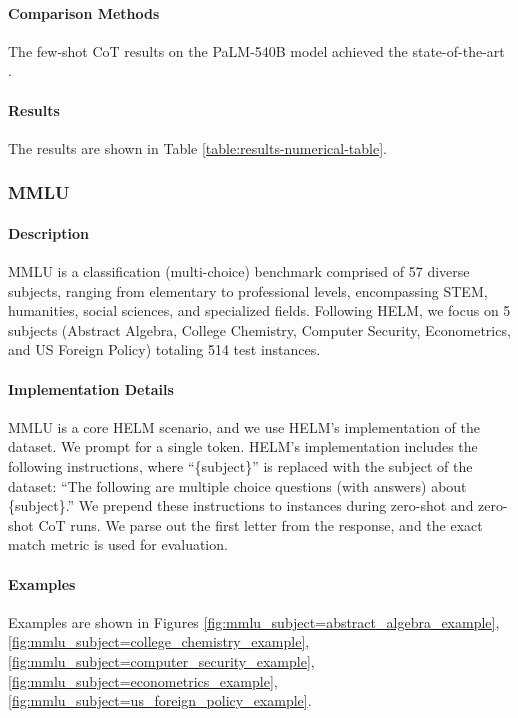 \paragraph{Comparison Methods}
The few-shot CoT results on the PaLM-540B model achieved the state-of-the-art \citep{wei2023chainofthought}.

\paragraph{Results} The results are shown in Table \ref{table:results-numerical-table}.

\subsubsection{MMLU}
\paragraph{Description} MMLU \citep{hendrycks2021measuring} is a classification (multi-choice) benchmark comprised of 57 diverse subjects, ranging from elementary to professional levels, encompassing STEM, humanities, social sciences, and specialized fields. Following HELM, we focus on 5 subjects (Abstract Algebra, College Chemistry, Computer Security, Econometrics, and US Foreign Policy) totaling 514 test instances. 

\paragraph{Implementation Details}
MMLU is a core HELM scenario, and we use HELM's implementation of the dataset. We prompt for a single token. HELM's implementation includes the following instructions, where ``\{subject\}'' is replaced with the subject of the dataset: ``The following are multiple choice questions (with answers) about \{subject\}.'' We prepend these instructions to instances during zero-shot and zero-shot CoT runs. We parse out the first letter from the response, and the exact match metric is used for evaluation.

\paragraph{Examples} Examples are shown in Figures \ref{fig:mmlu_subject=abstract_algebra_example}, \ref{fig:mmlu_subject=college_chemistry_example}, \ref{fig:mmlu_subject=computer_security_example}, \ref{fig:mmlu_subject=econometrics_example}, \ref{fig:mmlu_subject=us_foreign_policy_example}.

